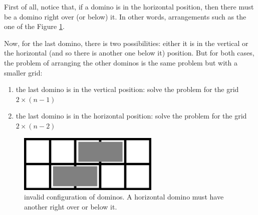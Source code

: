 First of all, notice that, if a domino is in the horizontal position, then there must be a domino right over (or below) it. In other words, arrangements such as the one of the Figure \ref{domino-arrangements:figure:impossible-arrangement}.

Now, for the last domino, there is two possibilities: either it is in the vertical or the horizontal (and so there is another one below it) position. But for both cases, the problem of arranging the other dominos is the same problem but with a smaller grid:

\begin{enumerate}
    \item the last domino is in the vertical position: solve the problem for the grid $2 \times (n-1)$
    \item the last domino is in the horizontal position: solve the problem for the grid $2 \times (n-2)$
\end{enumerate}

\begin{figure}[H]
    \centering
    \includegraphics[width=0.6\textwidth]{images/domino_arrangements/2x5_impossible.png}
    \caption{invalid configuration of dominos. A horizontal domino must have another right over or below it.}
    \label{domino-arrangements:figure:impossible-arrangement}
\end{figure}
